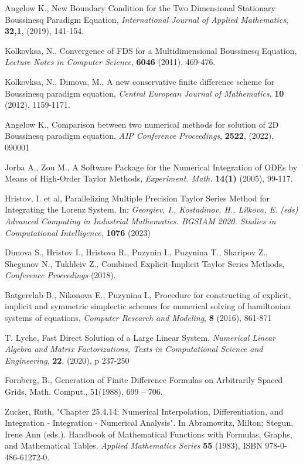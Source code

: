 \documentclass[a4paper]{article}
\theoremstyle{remark}
\begin{document}
\begin{large}
\begin{thebibliography}{99}
	 Angelow K., New Boundary Condition for the Two Dimensional Stationary Boussinesq Paradigm Equation, 
{\it International Journal of Applied Mathematics}, \textbf{32,1}, (2019), 141-154.

	 Kolkovksa, N., Convergence of FDS for a Multidimensional Boussinesq Equation, {\it Lecture Notes in Computer Science}, \textbf{6046} (2011), 469-476.

	 Kolkovksa, N., Dimova, M., A new conservative finite difference scheme for Boussinesq paradigm equation, {\it Central European Journal of Mathematics}, \textbf{10} (2012), 1159-1171.

	 Angelow K., Comparison between two numerical methods for solution of 2D Boussinesq paradigm equation, \emph{AIP Conference Proceedings}, \textbf{2522}, (2022), 090001

	 Jorba A., Zou M., A Software Package for the Numerical Integration of ODEs by Means of High-Order Taylor Methods, {\it Experiment. Math.} \textbf{14(1)} (2005), 99-117.

	 Hristov, I. et al, Parallelizing Multiple Precision Taylor Series Method for Integrating the Lorenz System. In: {\it Georgiev, I., Kostadinov, H., Lilkova, E. (eds) Advanced Computing in Industrial Mathematics. BGSIAM 2020. Studies in Computational Intelligence}, \textbf{1076} (2023)

	 Dimova S., Hristov I., Hristova R., Puzynin I., Puzynina T., Sharipov Z., Shegunov N., Tukhleiv Z., Combined Explicit-Implicit Taylor Series Methods, \emph{Conference Proceedings} (2018).

	 Batgerelab B., Nikonova E., Puzynina I., Procedure for constructing of explicit, implicit and symmetric simplectic schemes for numerical solving of hamiltonian systems of equations, {\it Computer Research and Modeling}, \textbf{8} (2016), 861-871

	 T. Lyche, Fast Direct Solution of a Large Linear System,
{\it Numerical Linear Algebra and Matrix Factorizations, Texts in Computational Science and Engineering}, \textbf{22}, (2020), p 237-250

	 Fornberg, B., Generation of Finite Difference Formulas on Arbitrarily Spaced Grids, 
Math. Comput., 51(1988),  699 -- 706.

	 Zucker, Ruth, "Chapter 25.4.14: Numerical Interpolation, Differentiation, and Integration - Integration - Numerical Analysis". In Abramowitz, Milton; Stegun, Irene Ann (eds.). Handbook of Mathematical Functions with Formulas, Graphs, and Mathematical Tables. 
{\it Applied Mathematics Series} \textbf{55}  (1983), ISBN 978-0-486-61272-0.


\end{thebibliography}
\end{large}
\end{document}

